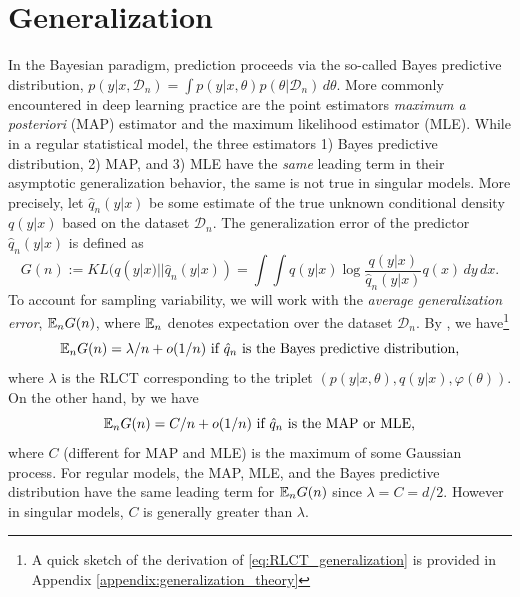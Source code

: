 \documentclass{article} %
\begin{document}
\section{Generalization}\label{section:gen_error}
In the Bayesian paradigm, prediction proceeds via the so-called Bayes predictive distribution,
$
p(y|x, \mathcal D_n) = \int p(y|x,\theta) p(\theta|\mathcal D_n) \,d\theta.
$
More commonly encountered in deep learning practice are the point estimators \textit{maximum a posteriori} (MAP) estimator and the maximum likelihood estimator (MLE).
While in a regular statistical model, the three estimators 1) Bayes predictive distribution, 2) MAP, and 3) MLE have the \textit{same} leading term in their asymptotic generalization behavior, the same is not true in singular models.
More precisely, let $\hat q_n(y|x)$ be some estimate of the true unknown conditional density $q(y|x)$ based on the dataset $\mathcal D_n$. The generalization error of the predictor $\hat q_n(y|x)$ is defined as
$$
G(n) := KL (q(y|x) || \hat q_n(y|x) ) = \int  \int q(y|x) \log \frac{q(y|x)}{\hat q_n(y|x)} q(x) \,dy  \,dx.
$$
To account for sampling variability, we will work with the \textit{average generalization error}, ${\mathbb{E}}_n G(n)$, where ${\mathbb{E}}_n$ denotes expectation over the dataset $\mathcal D_n$.
By {\citet[Theorem 1.2 and Theorem 7.2]{watanabe_algebraic_2009}}, we have\footnote{A quick sketch of the derivation of \eqref{eq:RLCT_generalization} is provided in Appendix \ref{appendix:generalization_theory}}
\begin{equation}
{\mathbb{E}}_n G(n) = \lambda/n + o(1/n)  \text{ if $\hat q_n$ is the Bayes predictive distribution,}
\label{eq:RLCT_generalization}
\end{equation}
where $\lambda$ is the RLCT corresponding to the triplet $( p(y|x,\theta), q(y|x), \varphi(\theta) )$.
On the other hand, by {\cite[Theorem 6.4]{watanabe_algebraic_2009}} we have
$$
{\mathbb{E}}_n G(n) = C/n + o(1/n)   \text{ if $\hat q_n$ is the MAP or MLE,}
$$
where $C$ (different for MAP and MLE) is the maximum of some Gaussian process. For regular models, the MAP, MLE, and the Bayes predictive distribution have the same leading term for ${\mathbb{E}}_n G(n)$ since $\lambda = C = d/2$. However in singular models, $C$ is generally greater than $\lambda$. 
\end{document}
